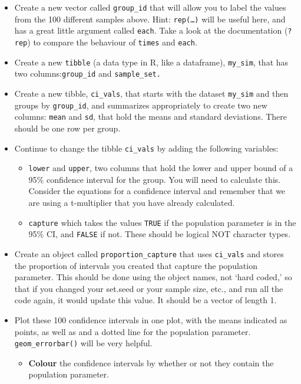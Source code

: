 \documentclass[
  openany]{book}
\begin{document}
\begin{itemize}
\item
  Create a new vector called \texttt{group\_id} that will allow you to label the values from the 100 different samples above. Hint: \texttt{rep(\ldots{})} will be useful here, and has a great little argument called \texttt{each}. Take a look at the documentation (\texttt{?rep}) to compare the behaviour of \texttt{times} and \texttt{each}.
\item
  Create a new \texttt{tibble} (a data type in R, like a dataframe), \texttt{my\_sim}, that has two columns:\texttt{group\_id} and \texttt{sample\_set.}
\item
  Create a new tibble, \texttt{ci\_vals}, that starts with the dataset \texttt{my\_sim} and then groups by \texttt{group\_id}, and summarizes appropriately to create two new columns: \texttt{mean} and \texttt{sd}, that hold the means and standard deviations. There should be one row per group.
\item
  Continue to change the tibble \texttt{ci\_vals} by adding the following variables:

  \begin{itemize}
  \item
    \texttt{lower} and \texttt{upper}, two columns that hold the lower and upper bound of a 95\% confidence interval for the group. You will need to calculate this. Consider the equations for a confidence interval and remember that we are using a t-multiplier that you have already calculated.
  \item
    \texttt{capture} which takes the values \texttt{TRUE} if the population parameter is in the 95\% CI, and \texttt{FALSE} if not. These should be logical NOT character types.
  \end{itemize}
\item
  Create an object called \texttt{proportion\_capture} that uses \texttt{ci\_vals} and stores the proportion of intervals you created that capture the population parameter. This should be done using the object names, not `hard coded,' so that if you changed your set.seed or your sample size, etc., and run all the code again, it would update this value. It should be a vector of length 1.
\item
  Plot these 100 confidence intervals in one plot, with the means indicated as points, as well as and a dotted line for the population parameter. \texttt{geom\_errorbar()} will be very helpful.

  \begin{itemize}
  \item
    \textbf{Colour} the confidence intervals by whether or not they contain the population parameter.


\end{itemize}
\end{itemize}
\end{document}
